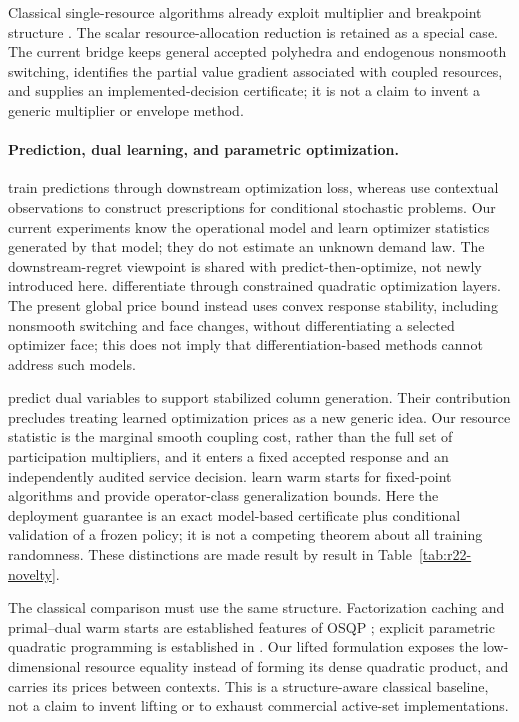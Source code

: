 \documentclass[11pt,letterpaper]{article}
\theoremstyle{definition}
\newcommand{\1}{\mathbf 1}
\begin{document}
Classical single-resource algorithms already exploit multiplier and breakpoint structure \citep{PatrikssonStromberg2015}. The scalar resource-allocation reduction is retained as a special case. The current bridge keeps general accepted polyhedra and endogenous nonsmooth switching, identifies the partial value gradient associated with coupled resources, and supplies an implemented-decision certificate; it is not a claim to invent a generic multiplier or envelope method.

\paragraph{Prediction, dual learning, and parametric optimization.}
\citet{ElmachtoubGrigas2022} train predictions through downstream optimization loss, whereas \citet{BertsimasKallus2020} use contextual observations to construct prescriptions for conditional stochastic problems. Our current experiments know the operational model and learn optimizer statistics generated by that model; they do not estimate an unknown demand law. The downstream-regret viewpoint is shared with predict-then-optimize, not newly introduced here. \citet{AmosKolter2017} differentiate through constrained quadratic optimization layers. The present global price bound instead uses convex response stability, including nonsmooth switching and face changes, without differentiating a selected optimizer face; this does not imply that differentiation-based methods cannot address such models.

\citet{KraulSeizingerBrunner2023} predict dual variables to support stabilized column generation. Their contribution precludes treating learned optimization prices as a new generic idea. Our resource statistic is the marginal smooth coupling cost, rather than the full set of participation multipliers, and it enters a fixed accepted response and an independently audited service decision. \citet{Sambharya2024} learn warm starts for fixed-point algorithms and provide operator-class generalization bounds. Here the deployment guarantee is an exact model-based certificate plus conditional validation of a frozen policy; it is not a competing theorem about all training randomness. These distinctions are made result by result in Table~\ref{tab:r22-novelty}.

The classical comparison must use the same structure. Factorization caching and primal--dual warm starts are established features of OSQP \citep{Stellato2020}; explicit parametric quadratic programming is established in \citet{Bemporad2002}. Our lifted formulation exposes the low-dimensional resource equality instead of forming its dense quadratic product, and carries its prices between contexts. This is a structure-aware classical baseline, not a claim to invent lifting or to exhaust commercial active-set implementations.
\end{document}

